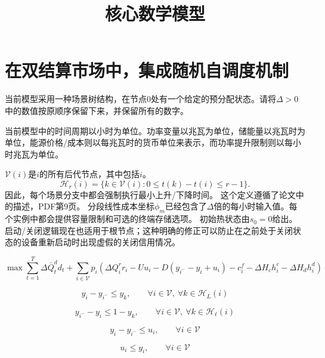 \documentclass{article}
\title{核心数学模型}
\date{}
\begin{document}
\maketitle

\section*{在双结算市场中，集成随机自调度机制}


当前模型采用一种场景树结构，在节点0处有一个给定的预分配状态。请将$\Delta>0$中的数值按原顺序保留下来，并保留所有的数字。

当前模型中的时间周期以小时为单位。功率变量以兆瓦为单位，储能量以兆瓦时为单位，能源价格/成本则以每兆瓦时的货币单位来表示，而功率提升限制则以每小时兆瓦为单位。

$\mathcal V(i)$是$i$的所有后代节点，其中包括$i$。
\[
\mathcal H_r(i)=\{k\in\mathcal V(i):0\le t(k)-t(i)\le r-1\}.
\]
因此，每个场景分支中都会强制执行最小上升/下降时间。  
这个定义遵循了论文中的描述，PDF第9页。  
分段线性成本坐标$\phi_m$已经包含了$\Delta$倍的每小时输入值。每个实例中都会提供容量限制和可选的终端存储选项。  
初始热状态由$s_0=0$给出。启动/关闭逻辑现在也适用于根节点；这种明确的修正可以防止在之前处于关闭状态的设备重新启动时出现虚假的关闭信用情况。


\begin{equation}
\max
\sum_{t=1}^T \Delta\bar{Q}_t^d d_t
+ \sum_{i \in \mathcal{V}} p_i
\left(
\Delta Q_i^r r_i
- Uu_i
- D(y_{i^-} - y_i + u_i)
- c_i^f
- \Delta H_c h_i^c
- \Delta H_d h_i^d
\right)
\tag{TMS-DE}
\end{equation}

\begin{equation}
y_i - y_{i^-} \le y_k,
\qquad
\forall i \in \mathcal{V},\ \forall k \in \mathcal{H}_L(i)
\tag{1a}
\end{equation}

\begin{equation}
y_{i^-} - y_i \le 1 - y_k,
\qquad
\forall i \in \mathcal{V},\ \forall k \in \mathcal{H}_{\ell}(i)
\tag{1b}
\end{equation}

\begin{equation}
y_i - y_{i^-} \le u_i,
\qquad
\forall i \in \mathcal{V}
\tag{1c}
\end{equation}

\begin{equation}
u_i \le y_i,
\qquad
\forall i \in \mathcal{V}
\tag{1d-1}
\end{equation}
\end{document}
